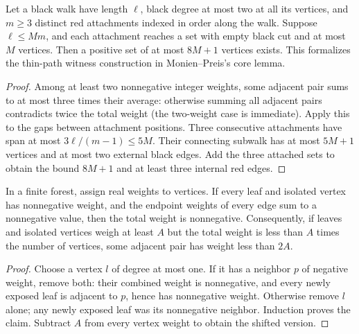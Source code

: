 \begin{theorem}
  \label{thm:lowerbounds-algebraic-red-black-thin-walk}
  \leanok
  Let a black walk have length $\ell$, black degree at most two at all
  its vertices, and $m\ge3$ distinct red attachments indexed in order
  along the walk. Suppose $\ell\le Mm$, and each attachment reaches a
  set with empty black cut and at most $M$ vertices. Then a positive
  set of at most $8M+1$ vertices exists. This formalizes the thin-path
  witness construction in Monien--Preis's core lemma.
\end{theorem}
\begin{proof}
  \leanok
  Among at least two nonnegative integer weights, some adjacent pair
  sums to at most three times their average: otherwise summing all
  adjacent pairs contradicts twice the total weight (the two-weight case
  is immediate). Apply this to the gaps between attachment positions.
  Three consecutive attachments have span at most $3\ell/(m-1)\le5M$.
  Their connecting subwalk has at most $5M+1$ vertices and at most two
  external black edges. Add the three attached sets to obtain the bound
  $8M+1$ and at least three internal red edges.
\end{proof}

\begin{theorem}
  \label{thm:lowerbounds-algebraic-forest-weight}
  \leanok
  In a finite forest, assign real weights to vertices. If every leaf and
  isolated vertex has nonnegative weight, and the endpoint weights of
  every edge sum to a nonnegative value, then the total weight is
  nonnegative. Consequently, if leaves and isolated vertices weigh at
  least $A$ but the total weight is less than $A$ times the number of
  vertices, some adjacent pair has weight less than $2A$.
\end{theorem}
\begin{proof}
  \leanok
  Choose a vertex $l$ of degree at most one. If it has a neighbor $p$ of
  negative weight, remove both: their combined weight is nonnegative,
  and every newly exposed leaf is adjacent to $p$, hence has nonnegative
  weight. Otherwise remove $l$ alone; any newly exposed leaf was its
  nonnegative neighbor. Induction proves the claim. Subtract $A$ from
  every vertex weight to obtain the shifted version.
\end{proof}

